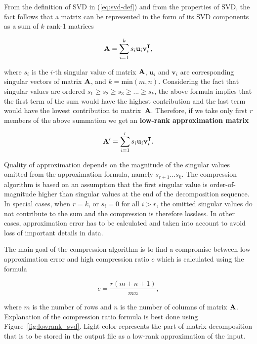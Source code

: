 From the definition of SVD in (\ref{eq:svd-def}) and from the properties of SVD, the fact follows that a matrix can be represented in the form of its SVD components as a sum of $k$ rank-1 matrices

\begin{equation}
\mathbf{A}=\sum_{i=1}^{k} s_{i}\mathbf{u}_{i}\mathbf{v}_{i}^{\mathsf{T}},
\label{eq:svd-expansion}
\end{equation}

\noindent
where $s_i$ is the $i$-th singular value of matrix $\mathbf{A}$, $\mathbf{u}_i$ and $\mathbf{v}_i$ are corresponding singular vectors of matrix $\mathbf{A}$, and $k = \mathrm{min}(m, n)$. Considering the fact that singular values are ordered $s_{1} \geq s_{2} \geq s_{3} \geq ... \geq s_{k}$, the above formula implies that the first term of the sum would have the highest contribution and the last term would have the lowest contribution to matrix~$\mathbf{A}$. Therefore, if we take only first $r$ members of the above summation we get an \textbf{low-rank approximation matrix}

\begin{equation}
\mathbf{A'}=\sum_{i=1}^{r} s_{i}\mathbf{u}_{i}\mathbf{v}_{i}^{\mathsf{T}}.
\label{eq:svd-approx-expansion}
\end{equation}


Quality of approximation depends on the magnitude of the singular values omitted from the approximation formula, namely $s_{r+1} ...  s_{k}$. The compression algorithm is based on an assumption that the first singular value is order-of-magnitude higher than singular values at the end of the decomposition sequence. In special cases, when $r=k$, or $s_{i}=0$ for all $i > r$, the omitted singular values do not contribute to the sum and the compression is therefore lossless. In other cases, approximation error has to be calculated and taken into account to avoid loss of important details in data.

The main goal of the compression algorithm is to find a compromise between low approximation error and high compression ratio $c$ which is calculated using the formula

\begin{equation}
c=\frac{r(m+n+1)}{m n},
\label{eq:cr-def}
\end{equation}

\noindent
where $m$ is the number of rows and $n$ is the number of columns of matrix $\mathbf{A}$. Explanation of the compression ratio formula is best done using Figure~\ref{fig:lowrank_svd}. Light color represents the part of matrix decomposition that is to be stored in the output file as a low-rank approximation of the input.


